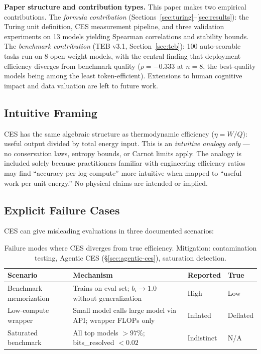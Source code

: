 \documentclass[12pt]{article}
\begin{document}
\noindent\textbf{Paper structure and contribution types.} This paper makes two empirical contributions. The \textit{formula contribution} (Sections~\ref{sec:turing}--\ref{sec:results}): the Turing unit definition, CES measurement pipeline, and three validation experiments on 13 models yielding Spearman correlations and stability bounds. The \textit{benchmark contribution} (TEB v3.1, Section~\ref{sec:teb}): 100 auto-scorable tasks run on 8 open-weight models, with the central finding that deployment efficiency diverges from benchmark quality ($\rho = -0.333$ at $n = 8$, the best-quality models being among the least token-efficient). Extensions to human cognitive impact and data valuation are left to future work.

\subsection{Intuitive Framing}

CES has the same algebraic structure as thermodynamic efficiency ($\eta = W/Q$): useful output divided by total energy input. This is an \textit{intuitive analogy only} --- no conservation laws, entropy bounds, or Carnot limits apply. The analogy is included solely because practitioners familiar with engineering efficiency ratios may find ``accuracy per log-compute'' more intuitive when mapped to ``useful work per unit energy.'' No physical claims are intended or implied.

\subsection{Explicit Failure Cases}
\label{sec:failure-cases}

CES can give misleading evaluations in three documented scenarios:

\begin{table}[H]
\centering
\small
\begin{tabular}{p{2.5cm}p{5.0cm}ll}
\toprule
\textbf{Scenario} & \textbf{Mechanism} & \textbf{Reported} & \textbf{True} \\
\midrule
Benchmark memorization & Trains on eval set; $b_i \to 1.0$ without generalization & High & Low \\
Low-compute wrapper & Small model calls large model via API; wrapper FLOPs only & Inflated & Deflated \\
Saturated benchmark & All top models $> 97\%$; bits\_resolved $< 0.02$ & Indistinct & N/A \\
\bottomrule
\end{tabular}
\caption{Failure modes where CES diverges from true efficiency. Mitigation: contamination testing, Agentic CES (\S\ref{sec:agentic-ces}), saturation detection.}
\end{table}
\end{document}

